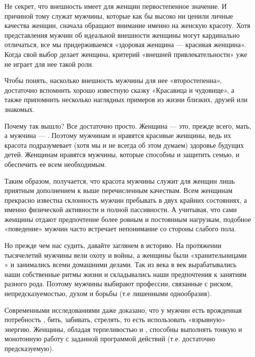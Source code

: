 Не секрет, что внешность имеет для женщин первостепенное значение. И причиной тому служат мужчины, которые как бы высоко ни ценили личные качества женщин, сначала обращают внимание именно на женскую красоту. Хотя представления мужчин об идеальной внешности женщины могут кардинально отличаться, все мы придерживаемся   «здоровая женщина --- красивая женщина». Когда свой выбор делает женщина, критерий «внешней привлекательности» уже не играет для нее такой роли.

Чтобы понять, насколько внешность мужчины для нее «второстепенна», достаточно вспомнить хорошо известную сказку «Красавица и чудовище», а также припомнить несколько наглядных примеров из жизни близких, друзей или знакомых.

Почему так вышло? Все достаточно просто. Женщина --- это, прежде всего, мать, а мужчина --- . Поэтому мужчинам и нравятся красивые женщины, ведь их красота подразумевает (хотя мы и не всегда об этом думаем) здоровье будущих детей. Женщинам нравятся мужчины, которые способны и защитить семью, и обеспечить ее всем необходимым.

Таким образом, получается, что красота мужчины служит для женщин лишь приятным дополнением к выше перечисленным качествам. Всем женщинам прекрасно известна склонность мужчин пребывать в двух крайних состояниях, а именно физической активности и полной пассивности. А учитывая, что сами женщины отдают предпочтение более ровным и постоянным нагрузкам, подобное «поведение» мужчин часто встречает непонимание со стороны слабого пола.

Но прежде чем нас судить, давайте заглянем в историю. На протяжении тысячелетий мужчины вели охоту и войны, а женщины были «хранительницами » и занимались всеми домашними делами. Так из века в век вырабатывались наши собственные ритмы жизни и складывались наши предпочтения к занятиям разного рода. Поэтому мужчины выбирают профессии, связанные с риском, непредсказуемостью, духом  и борьбы (т.е лишенными однообразия).

Современными исследованиями даже доказано, что у мужчин есть врожденная потребность , бить, забивать, стрелять, то есть использовать «взрывную» энергию. Женщины, обладая терпеливостью и , способны выполнять тонкую и монотонную работу с заданной программой действий (т.е. достаточно предсказуемую).

